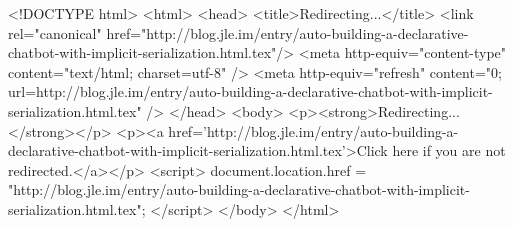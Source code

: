 <!DOCTYPE html>
<html>
<head>
<title>Redirecting...</title>
<link rel="canonical" href="http://blog.jle.im/entry/auto-building-a-declarative-chatbot-with-implicit-serialization.html.tex"/>
<meta http-equiv="content-type" content="text/html; charset=utf-8" />
<meta http-equiv="refresh" content="0; url=http://blog.jle.im/entry/auto-building-a-declarative-chatbot-with-implicit-serialization.html.tex" />
</head>
<body>
  <p><strong>Redirecting...</strong></p>
  <p><a href='http://blog.jle.im/entry/auto-building-a-declarative-chatbot-with-implicit-serialization.html.tex'>Click here if you are not redirected.</a></p>
  <script>
    document.location.href = "http://blog.jle.im/entry/auto-building-a-declarative-chatbot-with-implicit-serialization.html.tex";
  </script>
</body>
</html>
